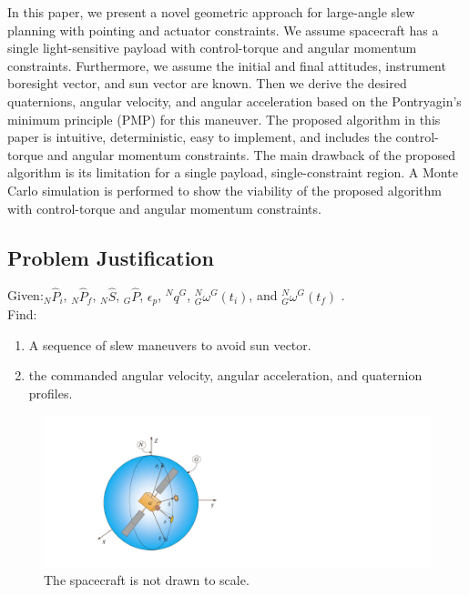 \documentclass[letterpaper, preprint, paper,11pt]{AAS}	%
\begin{document}
	In this paper, we present a novel geometric approach for large-angle slew planning with pointing and actuator constraints.  We assume spacecraft has a single light-sensitive payload with control-torque and angular momentum constraints. Furthermore, we assume the initial and final attitudes, instrument boresight vector, and sun vector are known. Then we derive the desired quaternions, angular velocity, and angular acceleration based on the Pontryagin's minimum principle (PMP) for this maneuver. The proposed algorithm in this paper is intuitive, deterministic, easy to implement, and includes the control-torque and angular momentum constraints. The main drawback of the proposed algorithm is its limitation for a single payload, single-constraint region.  A Monte Carlo simulation is performed to show the viability of the proposed algorithm with control-torque and angular momentum constraints. 
	
	
	\subsection{Problem Justification}
	
	Given:$_N\hat{P}_i$, $_N\hat{P}_f$, $_N\hat{S}$, $_G\hat{P}$, $\epsilon_p$, $^Nq^G$, $^N_G\omega^G(t_i)$, and $^N_G\omega^G(t_f)$ .\\
	
	Find: 
	\begin{enumerate}
		\item A sequence of slew maneuvers to avoid sun vector.
		\item the commanded angular velocity, angular acceleration, and quaternion profiles.
	\end{enumerate} 
	\begin{figure}[htb]
		\begin{center}
			\includegraphics[width=6in]{./Figures/SAS_Schematic}
			\caption{The spacecraft is not drawn to scale.}
		\end{center}
	\end{figure}
	
\end{document}
